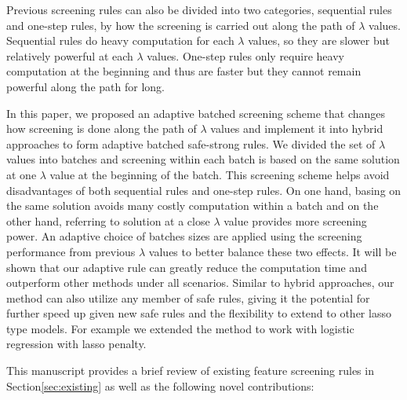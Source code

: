 \documentclass{article}
\begin{document}
Previous screening rules can also be divided into two categories, sequential rules and one-step rules, by how the screening is carried out along the path of $\lambda$ values. Sequential rules do heavy computation for each $\lambda$ values, so they are slower but relatively powerful at each $\lambda$ values. One-step rules only require heavy computation at the beginning and thus are faster but they cannot remain powerful along the path for long. 

In this paper, we proposed an adaptive batched screening scheme that changes how screening is done along the path of $\lambda$ values and implement it into hybrid approaches to form adaptive batched safe-strong rules. We divided the set of $\lambda$ values into batches and screening within each batch is based on the same solution at one $\lambda$ value at the beginning of the batch. This screening scheme helps avoid disadvantages of both sequential rules and one-step rules. On one hand, basing on the same solution avoids many costly computation within a batch and on the other hand, referring to solution at a close $\lambda$ value provides more screening power. An adaptive choice of batches sizes are applied using the screening performance from previous $\lambda$ values to better balance these two effects. It will be shown that our adaptive rule can greatly reduce the computation time and outperform other methods under all scenarios. Similar to hybrid approaches, our method can also utilize any member of safe rules, giving it the potential for further speed up given new safe rules and the flexibility to extend to other lasso type models. For example we extended the method to work with logistic regression with lasso penalty.

This manuscript provides a brief review of existing feature screening rules in Section\ref{sec:existing} as well as the following novel contributions:
\end{document}
